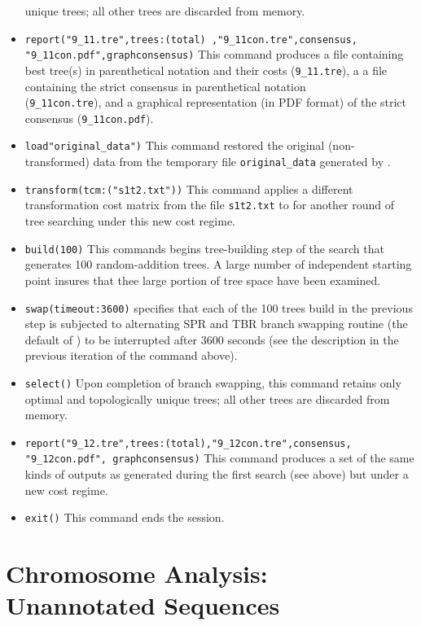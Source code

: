 \begin{itemize}
unique trees; all other trees are discarded from memory.
\item \texttt{report("9\_11.tre",trees:(total) ,"9\_11con.tre",consensus,\\ "9\_11con.pdf",graphconsensus)} This command 
produces a file containing best tree(s) in parenthetical notation and their costs (\texttt{9\_11.tre}), a a file containing the 
strict consensus in parenthetical notation \\(\texttt{9\_11con.tre}), and a graphical representation (in PDF format) of the 
strict consensus (\texttt{9\_11con.pdf}).
\item \texttt{load"original\_data")} This command restored the original (non-trans\-formed) data from the temporary file 
\texttt{original\_data} generated by .
\item \texttt{transform(tcm:("s1t2.txt"))} This command applies a different transformation cost matrix from the file 
\texttt{s1t2.txt} to for another round of tree searching under this new cost regime.
\item \texttt{build(100)} This commands begins tree-building step of the search that generates 100 random-addition 
trees. A large number of independent starting point insures that thee large portion of tree space have been 
examined.
\item \texttt{swap(timeout:3600)}  specifies that each of the 100 trees build in the previous step is 
subjected to alternating SPR and TBR branch swapping routine (the default of \poy) to be interrupted after 3600 
seconds (see the description in the previous iteration of the command above).
\item \texttt{select()} Upon completion of branch swapping, this command retains only optimal and topologically 
unique trees; all other trees are discarded from memory.
\item \texttt{report("9\_12.tre",trees:(total),"9\_12con.tre",consensus,\\"9\_12con.pdf", graphconsensus)} This command 
produces a set of the same kinds of outputs as generated during the first search (see above) but under a new cost 
regime.
\item \texttt{exit()} This command ends the \poy session.
\end{itemize}


\section{Chromosome Analysis: Unannotated Sequences}{\label{tutorial8}}

